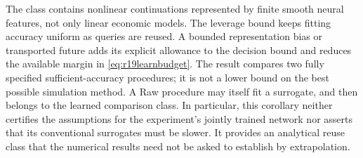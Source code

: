 The class contains nonlinear continuations represented by finite smooth
neural features, not only linear economic models. The leverage bound keeps
fitting accuracy uniform as queries are reused. A bounded representation
bias or transported future adds its explicit allowance to the decision bound
and reduces the available margin in \eqref{eq:r19learnbudget}. The result
compares two fully specified sufficient-accuracy procedures; it is not a
lower bound on the best possible simulation method. A Raw procedure may
itself fit a surrogate, and then belongs to the learned comparison class.
In particular, this corollary neither certifies the assumptions for the
experiment's jointly trained network nor asserts that its conventional
surrogates must be slower. It provides an analytical reuse class that the
numerical results need not be asked to establish by extrapolation.

